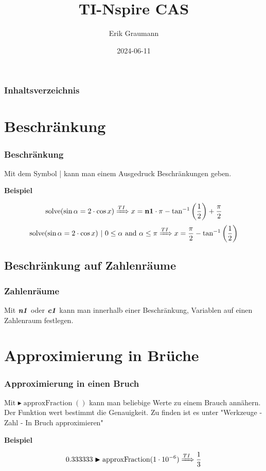\documentclass[10pt,ngerman]{beamer}
\title{TI-Nspire CAS}
\author{Erik Graumann}
\institute[TSS]{Theodor-Storm-Schule Husum}
\date{2024-06-11}
\begin{document}
\frame{\titlepage}

\begin{frame}
	\frametitle{Inhaltsverzeichnis}
	\tableofcontents
\end{frame}

\section{Beschränkung}

\begin{frame}
	\frametitle{Beschränkung}

	Mit dem Symbol | kann man einem Ausgedruck Beschränkungen geben. \newline

	\textbf{Beispiel}

	\begin{equation}
		\operatorname{solve}(\sin \alpha = 2 \cdot \cos x) \xRightarrow{TI} x = \textbf{n1} \cdot \pi-\tan^{-1}\left(\frac{1}{2}\right) + \frac{\pi}{2}
	\end{equation}
	\begin{equation}
		\operatorname{solve}(\sin \alpha = 2 \cdot \cos x)\ \vert \ 0 \le \alpha\ \text{and}\ \alpha \le \pi \xRightarrow{TI} x = \frac{\pi}{2} - \tan^{-1}\left(\frac{1}{2}\right)
	\end{equation}

\end{frame}

\subsection{Beschränkung auf Zahlenräume}

\begin{frame}
	\frametitle{Zahlenräume}

	Mit \(\text{\textbf{\textit{n1}}}\) oder \(\text{\textbf{\textit{c1}}}\) kann man innerhalb einer Beschränkung, Variablen auf einen Zahlenraum festlegen.

\end{frame}

\section{Approximierung in Brüche}

\begin{frame}
	\frametitle{Approximierung in einen Bruch}

	Mit \(\blacktriangleright\operatorname{approxFraction}()\) kann man beliebige Werte zu einem Brauch annähern. Der Funktion wert bestimmt die Genauigkeit. Zu finden ist es unter "Werkzeuge - Zahl - In Bruch approximieren" \newline

	\textbf{Beispiel}

	\begin{equation}
		0.333333 \blacktriangleright\operatorname{approxFraction}(1 \cdot 10^{-6}) \xRightarrow{TI} \frac{1}{3}
	\end{equation}


\end{frame}
\end{document}
